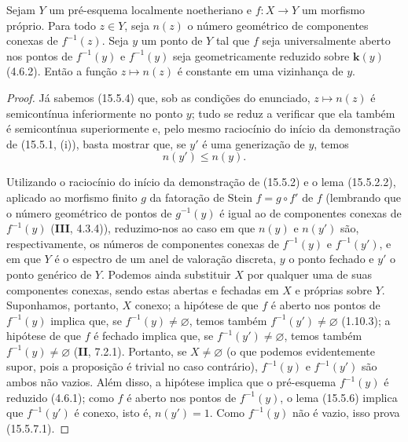 \begin{proposition}[15.5.7]
\label{IV.15.5.7}
Sejam $Y$ um pré-esquema localmente noetheriano e $f:X\to Y$ um morfismo próprio. Para todo $z\in Y$, seja $n(z)$ o número geométrico de componentes conexas de $f^{-1}(z)$. Seja $y$ um ponto de $Y$ tal que $f$ seja universalmente aberto nos pontos de $f^{-1}(y)$ e $f^{-1}(y)$ seja geometricamente reduzido sobre $\mathbf{k}(y)$ (4.6.2). Então a função $z\mapsto n(z)$ é constante em uma vizinhança de $y$.
\end{proposition}

\begin{proof}
Já sabemos (15.5.4) que, sob as condições do enunciado, $z\mapsto n(z)$ é semicontínua inferiormente no ponto $y$; tudo se reduz a verificar que ela também é semicontínua superiormente e, pelo mesmo raciocínio do início da demonstração de (15.5.1, (i)), basta mostrar que, se $y'$ é uma generização de $y$, temos
\begin{equation}
\tag{15.5.7.1}
\label{IV.15.5.7.1}
  n(y')\leqslant n(y).
\end{equation}

Utilizando o raciocínio do início da demonstração de (15.5.2) e o lema (15.5.2.2), aplicado ao morfismo finito $g$ da fatoração de Stein $f=g\circ f'$ de $f$ (lembrando que o número geométrico de pontos de $g^{-1}(y)$ é igual ao de componentes conexas de $f^{-1}(y)$ (\textbf{III}, 4.3.4)), reduzimo-nos ao caso em que $n(y)$ e $n(y')$ são, respectivamente, os números de componentes conexas de $f^{-1}(y)$ e $f^{-1}(y')$, e em que $Y$ é o espectro de um anel de valoração discreta, $y$ o ponto fechado e $y'$ o ponto genérico de $Y$. Podemos ainda substituir $X$ por qualquer uma de suas componentes conexas, sendo estas abertas e fechadas em $X$ e próprias sobre $Y$. Suponhamos, portanto, $X$ conexo; a hipótese de que $f$ é aberto nos pontos de $f^{-1}(y)$ implica que, se $f^{-1}(y)\ne\varnothing$, temos também $f^{-1}(y')\ne\varnothing$ (1.10.3); a hipótese de que $f$ é fechado implica que, se $f^{-1}(y')\ne\varnothing$, temos também $f^{-1}(y)\ne\varnothing$ (\textbf{II}, 7.2.1). Portanto, se $X\ne\varnothing$ (o que podemos evidentemente supor, pois a proposição é trivial no caso contrário), $f^{-1}(y)$ e $f^{-1}(y')$ são ambos não vazios. Além disso, a hipótese implica que o pré-esquema $f^{-1}(y)$ é reduzido (4.6.1); como $f$ é aberto nos pontos de $f^{-1}(y)$, o lema (15.5.6) implica que $f^{-1}(y')$ é conexo, isto é, $n(y')=1$. Como $f^{-1}(y)$ não é vazio, isso prova (15.5.7.1).
\end{proof}

